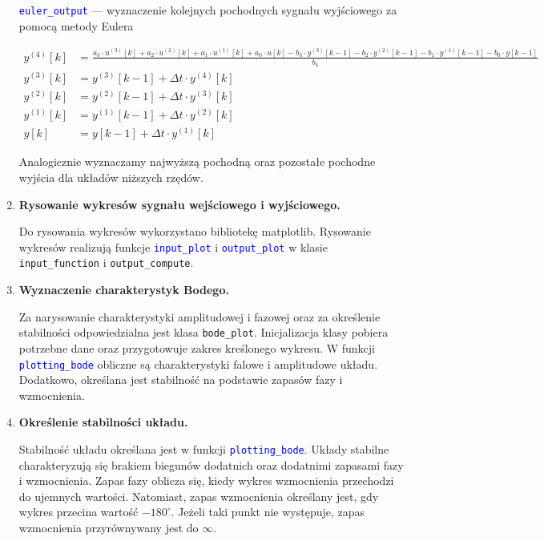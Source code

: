 \documentclass[10pt, a4paper]{article}
\begin{document}
\begin{enumerate}[label=\alph*.]
\vspace{0.1cm}

\textcolor{blue}{\texttt{euler\_output}} --- wyznaczenie kolejnych pochodnych sygnału wyjściowego za pomocą metody Eulera

{\footnotesize
\begin{align*}
y^{(4)}[k] &= \frac{a_3 \cdot u^{(3)}[k] + a_2 \cdot u^{(2)}[k] + a_1 \cdot u^{(1)}[k] + a_0 \cdot u[k] - b_3 \cdot y^{(3)}[k-1] - b_2 \cdot y^{(2)}[k-1] - b_1 \cdot y^{(1)}[k-1] - b_0 \cdot y[k-1]}{b_4} \\
y^{(3)}[k] &= y^{(3)}[k-1] + \Delta t \cdot y^{(4)}[k] \\
y^{(2)}[k] &= y^{(2)}[k-1] + \Delta t \cdot y^{(3)}[k] \\
y^{(1)}[k] &= y^{(1)}[k-1] + \Delta t \cdot y^{(2)}[k] \\
y[k] &= y[k-1] + \Delta t \cdot y^{(1)}[k]
\end{align*}
}

Analogicznie wyznaczamy najwyższą pochodną oraz pozostałe pochodne wyjścia dla układów niższych rzędów.

  \vspace{0.2cm}

  \item \textbf{Rysowanie wykresów sygnału wejściowego i wyjściowego.} \par\vspace{0.1cm}
  Do rysowania wykresów wykorzystano bibliotekę matplotlib. Rysowanie wykresów realizują funkcje \textcolor{blue}{\texttt{input\_plot}} i \textcolor{blue}{\texttt{output\_plot}}
  w klasie {\texttt{input\_function}} i {\texttt{output\_compute}}.

  \vspace{0.2cm}
  
  \item \textbf{Wyznaczenie charakterystyk Bodego.} \par\vspace{0.1cm}
    Za narysowanie charakterystyki amplitudowej i fazowej oraz za określenie stabilności
    odpowiedzialna jest klasa {\texttt{bode\_plot}}. Inicjalizacja klasy pobiera potrzebne dane
    oraz przygotowuje zakres kreślonego wykresu. W funkcji \textcolor{blue}{\texttt{plotting\_bode}} obliczne są charakterystyki falowe i amplitudowe
    układu. Dodatkowo, określana jest stabilność na podstawie zapasów fazy i wzmocnienia.
  \vspace{0.2cm}

  \item \textbf{Określenie stabilności układu.} \par\vspace{0.1cm}
  Stabilność układu określana jest w funkcji \textcolor{blue}{\texttt{plotting\_bode}}.
  Układy stabilne charakteryzują się brakiem biegunów dodatnich oraz dodatnimi zapasami fazy i wzmocnienia.
  Zapas fazy oblicza się, kiedy wykres wzmocnienia przechodzi do ujemnych wartości. Natomiast, zapas wzmocnienia określany jest, gdy wykres przecina wartość $-180^{\circ}$.
  Jeżeli taki punkt nie występuje, zapas wzmocnienia przyrównywany jest do $\infty$.
\end{enumerate}
\end{document}
